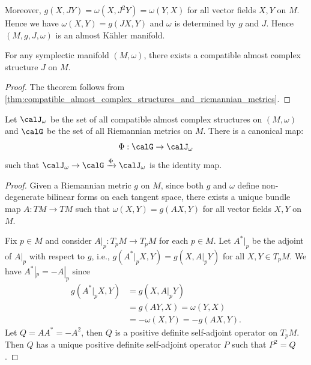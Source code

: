   Moreover, $g(X, JY) = \omega(X, J^2 Y) = \omega(Y, X)$ for all vector fields $X, Y$ on $M$.
  Hence we have $\omega(X, Y) = g(JX, Y)$ and $\omega$ is determined by $g$ and $J$.
  Hence $(M, g, J, \omega)$ is an almost K\"ahler manifold.

  \begin{theorem}
    For any symplectic manifold $(M, \omega)$, there exists a compatible almost complex structure $J$ on $M$.
  \end{theorem}
  \begin{proof}
    The theorem follows from \cref{thm:compatible_almost_complex_structures_and_riemannian_metrics}.
  \end{proof}

  \begin{theorem}\label{thm:compatible_almost_complex_structures_and_riemannian_metrics}
    Let $\calJ_\omega$ be the set of all compatible almost complex structures on $(M, \omega)$ and 
    $\calG$ be the set of all Riemannian metrics on $M$.
    There is a canonical map: 
    \[ \Phi: \calG \to \calJ_\omega \]
    such that $\calJ_\omega \to \calG \xrightarrow{\Phi} \calJ_\omega$ is the identity map.
  \end{theorem}
  \begin{proof}
    Given a Riemannian metric $g$ on $M$, since both $g$ and $\omega$ define non-degenerate bilinear forms on each tangent space, there exists a unique bundle map $A: TM \to TM$ such that $\omega(X, Y) = g(AX, Y)$ for all vector fields $X, Y$ on $M$.

    Fix $p \in M$ and consider $A|_p: T_p M \to T_p M$ for each $p \in M$.
    Let $A^*|_p$ be the adjoint of $A|_p$ with respect to $g$, i.e., $g(A^*|_p X, Y) = g(X, A|_p Y)$ for all $X, Y \in T_p M$.
    We have $A^*|_p = -A|_p$ since 
    \begin{align*}
      g(A^*|_p X, Y) & = g(X, A|_p Y) \\
        & = g(AY, X) = \omega(Y, X) \\
        & = -\omega(X, Y) = -g(AX, Y).
    \end{align*}
    Let $Q = A A^* = -A^2$, then $Q$ is a positive definite self-adjoint operator on $T_p M$.
    Then $Q$ has a unique positive definite self-adjoint operator $P$ such that $P^2 = Q$.
  \end{proof}

